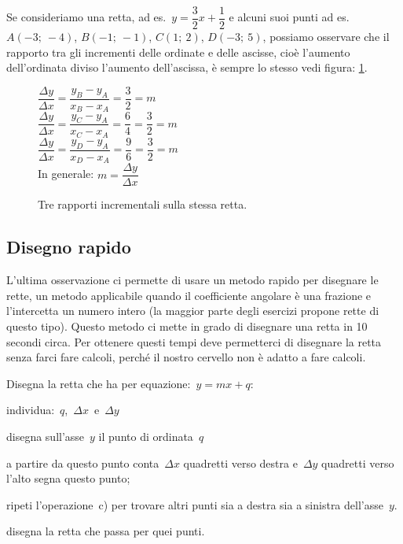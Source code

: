 Se consideriamo una retta, ad es.~\(y=\dfrac{3}{2}x +\dfrac{1}{2}\) e alcuni 
suoi punti ad es.~\(A(-3;~-4)\), \(B(-1;~-1)\), \(C(1;~2)\), \(D(-3;~5)\), 
possiamo osservare che il rapporto tra gli incrementi delle ordinate e delle 
ascisse, cioè l'aumento dell'ordinata diviso l'aumento dell'ascissa, è sempre 
lo stesso vedi figura: \ref{fig:rappincr}.

\begin{inaccessibleblock}
 \begin{figure}[h]
 \centering
 \begin{minipage}[]{.50\textwidth}
\(\dfrac{\Delta y}{\Delta x} =
\dfrac{y_B - y_A}{x_B - x_A} = \dfrac{3}{2} = m\)\\

\(\dfrac{\Delta y}{\Delta x} =
\dfrac{y_C - y_A}{x_C - x_A} = \dfrac{6}{4} = \dfrac{3}{2} = m\)\\

\(\dfrac{\Delta y}{\Delta x} =
\dfrac{y_D - y_A}{x_D - x_A} = \dfrac{9}{6} = \dfrac{3}{2} = m\)\\

In generale: \(m = \dfrac{\Delta y}{\Delta x}\)
 \end{minipage}
 \begin{minipage}[]{.40\textwidth}
   \centering \rappincr
 \end{minipage}
  \caption{Tre rapporti incrementali sulla stessa retta.}\label{fig:rappincr}
\end{figure}
\end{inaccessibleblock}


\subsection{Disegno rapido}

L'ultima osservazione ci permette di usare un metodo rapido per disegnare 
le rette, un metodo applicabile quando il coefficiente angolare è una 
frazione e l'intercetta un numero intero (la maggior parte degli esercizi 
propone rette di questo tipo). Questo metodo ci mette in grado di disegnare 
una retta in 10 secondi circa. Per ottenere questi tempi deve permetterci di 
disegnare la retta senza farci fare calcoli, perché il nostro cervello non è 
adatto a fare calcoli.

\begin{procedura}
 Disegna la retta che ha per equazione:~\(y=mx+q\):
 \begin{enumeratea}
  \item individua:~\(q\),~\(\Delta x\)~e~\(\Delta y\)
  \item disegna sull'asse~\(y\) il punto di ordinata~\(q\)
  \item a partire da questo punto conta~\(\Delta x\) quadretti verso destra
   e~\(\Delta y\) quadretti verso l'alto segna questo punto;
  \item ripeti l'operazione~c) per trovare altri punti sia a destra sia
   a sinistra dell'asse~\(y\).
  \item disegna la retta che passa per quei punti.
 \end{enumeratea}
\end{procedura}

